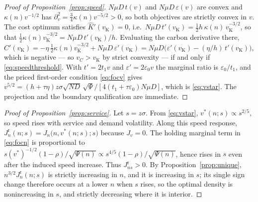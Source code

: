 \documentclass[11pt]{article}
\theoremstyle{definition}
\theoremstyle{remark}
\theoremstyle{plain}
\begin{document}
\begin{proof}[Proof of Proposition~\ref{prop:speed}]
$N\mu D\,t(v)$ and $N\mu D\,\varepsilon(v)$ are convex and $\kappa(n)v^{-1/2}$ has $\partial_v^2=\tfrac34 \kappa(n)v^{-5/2}>0$, so
both objectives are strictly convex in $v$. The cost optimum satisfies $\hat K'(v_{\mathrm K})=0$, i.e.\
$N\mu D\,t'(v_{\mathrm K})=\tfrac12 h\,\kappa(n)\,v_{\mathrm K}^{-3/2}$, so that $\tfrac12 \kappa(n)v_{\mathrm K}^{-3/2}=
N\mu D\,t'(v_{\mathrm K})/h$. Evaluating the carbon derivative there,
\[
  \hat C'(v_{\mathrm K})=-\eta\,\tfrac12 \kappa(n)v_{\mathrm K}^{-3/2}+N\mu D\,\varepsilon'(v_{\mathrm K})
  =N\mu D\big(\varepsilon'(v_{\mathrm K})-(\eta/h)\,t'(v_{\mathrm K})\big),
\]
which is negative --- so $v_C>v_{\mathrm K}$ by strict convexity --- if and only if \eqref{eq:speedthreshold}.
With $t'=2t_1 v$ and $\varepsilon'=2\varepsilon_0 v$ the marginal ratio is $\varepsilon_0/t_1$, and the priced
first-order condition \eqref{eq:focv} gives
$v^{5/2}=(h+\tau\eta)z\sigma\sqrt{ND}\,\sqrt{\Psi}/[4(t_1+\tau\varepsilon_0)N\mu D]$, which is
\eqref{eq:vstar}. The projection and the boundary qualification are immediate.
\end{proof}

\begin{proof}[Proof of Proposition~\ref{prop:service}]
Let $s=z\sigma$. From \eqref{eq:vstar}, $v^*(n;s)\propto s^{2/5}$, so speed rises with service and demand
volatility. Along this speed response, $J^{\mathrm r}_n(n;s)=J_n\big(n,v^*(n;s);s\big)$ because $J_v=0$. The
holding marginal term in \eqref{eq:focn} is proportional to
$s(v^*)^{-1/2}(1-\rho)/\sqrt{\Psi(n)}\propto s^{4/5}(1-\rho)/\sqrt{\Psi(n)}$, hence rises in $s$ even after
the induced speed increase. Thus $J^{\mathrm r}_{ns}>0$. By Proposition~\ref{prop:unique},
$n^{3/2}J^{\mathrm r}_n(n;s)$ is strictly increasing in $n$, and it is increasing in $s$; its single sign change
therefore occurs at a lower $n$ when $s$ rises, so the optimal density is nonincreasing in $s$, and strictly
decreasing where it is interior.
\end{proof}
\end{document}
